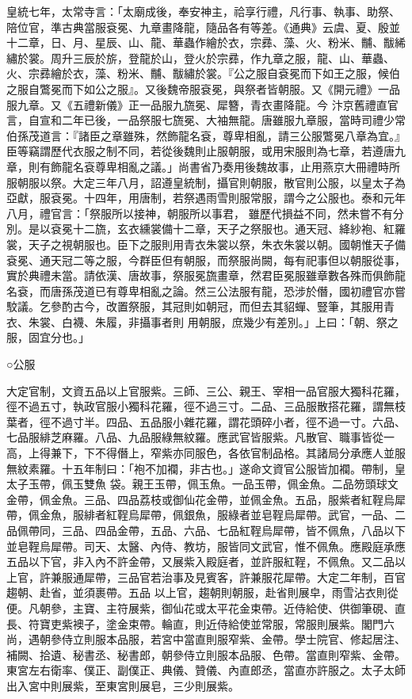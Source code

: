 \begin{pinyinscope}
 皇統七年，太常寺言：「太廟成後，奉安神主，祫享行禮，凡行事、執事、助祭、陪位官，準古典當服袞冕、九章畫降龍，隨品各有等差。《通典》云虞、夏、殷並十二章，日、月、星辰、山、龍、華蟲作繪於衣，宗彞、藻、火、粉米、黼、黻絺繡於裳。周升三辰於旂，登龍於山，登火於宗彞，作九章之服，龍、山、華蟲、火、宗彞繪於衣，藻、粉米、黼、黻繡於裳。『公之服自袞冕而下如王之服，候伯之服自鷩冕而下如公之服』。又後魏帝服袞冕，與祭者皆朝服。又《開元禮》一品服九章。又《五禮新儀》正一品服九旒冕、犀簪，青衣畫降龍。今
 汴京舊禮直官言，自宣和二年已後，一品祭服七旒冕、大袖無龍。唐雖服九章服，當時司禮少常伯孫茂道言：『諸臣之章雖殊，然飾龍名袞，尊卑相亂，請三公服鷩冕八章為宜。』臣等竊謂歷代衣服之制不同，若從後魏則止服朝服，或用宋服則為七章，若遵唐九章，則有飾龍名袞尊卑相亂之議。」尚書省乃奏用後魏故事，止用燕京大冊禮時所服朝服以祭。大定三年八月，詔遵皇統制，攝官則朝服，散官則公服，以皇太子為亞獻，服袞冕。十四年，用唐制，若祭遇雨雪則服常服，謂今之公服也。泰和元年八月，禮官言：「祭服所以接神，朝服所以事君，
 雖歷代損益不同，然未嘗不有分別。是以袞冕十二旒，玄衣纁裳備十二章，天子之祭服也。通天冠、絳紗袍、紅羅裳，天子之視朝服也。臣下之服則用青衣朱裳以祭，朱衣朱裳以朝。國朝惟天子備袞冕、通天冠二等之服，今群臣但有朝服，而祭服尚闕，每有祀事但以朝服從事，實於典禮未當。請依漢、唐故事，祭服冕旒畫章，然君臣冕服雖章數各殊而俱飾龍名袞，而唐孫茂道已有尊卑相亂之論。然三公法服有龍，恐涉於僭，國初禮官亦嘗駮議。乞參酌古今，改置祭服，其冠則如朝冠，而但去其貂蟬、豎筆，其服用青衣、朱裳、白襪、朱履，非攝事者則
 用朝服，庶幾少有差別。」上曰：「朝、祭之服，固宜分也。」



 ○公服



 大定官制，文資五品以上官服紫。三師、三公、親王、宰相一品官服大獨科花羅，徑不過五寸，執政官服小獨科花羅，徑不過三寸。二品、三品服散搭花羅，謂無枝葉者，徑不過寸半。四品、五品服小雜花羅，謂花頭碎小者，徑不過一寸。六品、七品服緋芝麻羅。八品、九品服綠無紋羅。應武官皆服紫。凡散官、職事皆從一高，上得兼下，下不得僭上，窄紫亦同服色，各依官制品格。其諸局分承應人並服無紋素羅。十五年制曰：「袍不加襴，非古也。」遂命文資官公服皆加襴。帶制，皇太子玉帶，佩玉雙魚
 袋。親王玉帶，佩玉魚。一品玉帶，佩金魚。二品笏頭球文金帶，佩金魚。三品、四品荔枝或御仙花金帶，並佩金魚。五品，服紫者紅鞓烏犀帶，佩金魚，服緋者紅鞓烏犀帶，佩銀魚，服綠者並皂鞓烏犀帶。武官，一品、二品佩帶同，三品、四品金帶，五品、六品、七品紅鞓烏犀帶，皆不佩魚，八品以下並皂鞓烏犀帶。司天、太醫、內侍、教坊，服皆同文武官，惟不佩魚。應殿庭承應五品以下官，非入內不許金帶，又展紫入殿庭者，並許服紅鞓，不佩魚。又二品以上官，許兼服通犀帶，三品官若治事及見賓客，許兼服花犀帶。大定二年制，百官趨朝、赴省，並須裹帶。五品
 以上官，趨朝則朝服，赴省則展皁，雨雪沾衣則從便。凡朝參，主寶、主符展紫，御仙花或太平花金束帶。近侍給使、供御筆硯、直長、符寶吏紫襖子，塗金束帶。輪直，則近侍給使並常服，常服則展紫。閣門六尚，遇朝參侍立則服本品服，若宮中當直則服窄紫、金帶。學士院官、修起居注、補闕、拾遺、秘書丞、秘書郎，朝參侍立則服本品服、色帶。當直則窄紫、金帶。東宮左右衛率、僕正、副僕正、典儀、贊儀、內直郎丞，當直亦許服之。太子太師出入宮中則展紫，至東宮則展皂，三少則展紫。




\end{pinyinscope}

